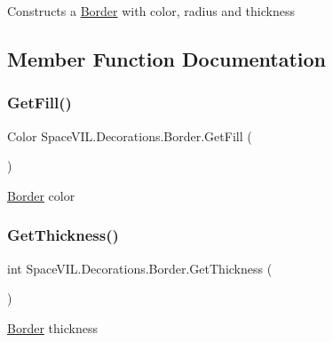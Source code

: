 Constructs a \mbox{\hyperlink{class_space_v_i_l_1_1_decorations_1_1_border}{Border}} with color, radius and thickness 



\subsection{Member Function Documentation}
\mbox{\label{class_space_v_i_l_1_1_decorations_1_1_border_aad64c5e394a76afaf146a06f87c7a287}} 
\subsubsection{\texorpdfstring{Get\+Fill()}{GetFill()}}
{\footnotesize\ttfamily Color Space\+V\+I\+L.\+Decorations.\+Border.\+Get\+Fill (\begin{DoxyParamCaption}{ }\end{DoxyParamCaption})\hspace{0.3cm}{\ttfamily [inline]}}



\mbox{\hyperlink{class_space_v_i_l_1_1_decorations_1_1_border}{Border}} color 

\mbox{\label{class_space_v_i_l_1_1_decorations_1_1_border_a0ec556844cb733cab7ad11bef7cbcac1}} 
\subsubsection{\texorpdfstring{Get\+Thickness()}{GetThickness()}}
{\footnotesize\ttfamily int Space\+V\+I\+L.\+Decorations.\+Border.\+Get\+Thickness (\begin{DoxyParamCaption}{ }\end{DoxyParamCaption})\hspace{0.3cm}{\ttfamily [inline]}}



\mbox{\hyperlink{class_space_v_i_l_1_1_decorations_1_1_border}{Border}} thickness 


